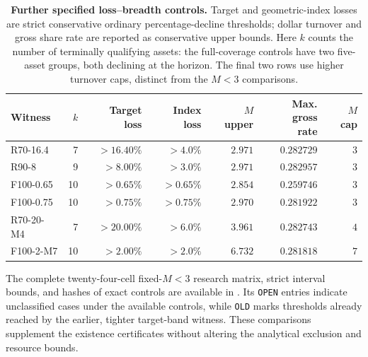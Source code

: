 \documentclass[review,hidelinks,onefignum,onetabnum]{siamonline250211}
\begin{document}
\begin{table}[H]\centering\scriptsize
\caption{\textbf{Further specified loss--breadth controls.}
Target and geometric-index losses are strict conservative ordinary
percentage-decline thresholds; dollar turnover and gross share rate
are reported as conservative upper bounds. Here $k$ counts the number
of terminally qualifying assets: the full-coverage controls have two
five-asset groups, both declining at the horizon. The final two rows
use higher turnover caps, distinct from the $M<3$ comparisons.}
\label{tab:loss-breadth-additional}
\begin{tabular}{@{}lrrrrrr@{}}\toprule
Witness & $k$ & Target loss & Index loss & $M$ upper &
\shortstack{Max. gross\\rate} & $M$ cap\\\midrule
R70-16.4 & 7 & $>16.40\%$ & $>4.0\%$ & $2.971$ & $0.282729$ & $3$\\
R90-8 & 9 & $>8.00\%$ & $>3.0\%$ & $2.971$ & $0.282957$ & $3$\\
F100-0.65 & 10 & $>0.65\%$ & $>0.65\%$ & $2.854$ & $0.259746$ & $3$\\
F100-0.75 & 10 & $>0.75\%$ & $>0.75\%$ & $2.970$ & $0.281922$ & $3$\\
R70-20-M4 & 7 & $>20.00\%$ & $>6.0\%$ & $3.961$ & $0.282743$ & $4$\\
F100-2-M7 & 10 & $>2.00\%$ & $>2.0\%$ & $6.732$ & $0.281818$ & $7$\\
\bottomrule\end{tabular}
\end{table}

The complete twenty-four-cell fixed-$M<3$ research matrix,
strict interval bounds, and hashes of exact controls are
available in .
Its \texttt{OPEN} entries indicate unclassified cases under
the available controls, while \texttt{OLD} marks thresholds
already reached by the earlier, tighter target-band witness.
These comparisons supplement the existence certificates
without altering the analytical exclusion and resource bounds.


\enlargethispage{2\baselineskip}

\end{document}
